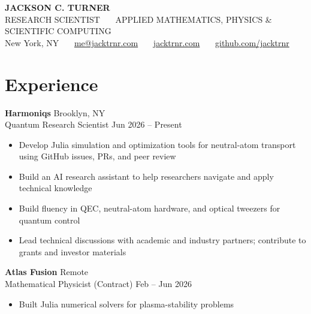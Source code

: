 \documentclass[10pt]{article}
\begin{document}
\fontsize{10.7pt}{13.4pt}\selectfont

\begin{center}
    {\Large\bfseries JACKSON C. TURNER}\\[3pt]
    {\color{accent}\small RESEARCH SCIENTIST \ \textbar\ \ APPLIED MATHEMATICS, PHYSICS \& SCIENTIFIC COMPUTING}\\[4pt]
    {\small New York, NY \ \textbar\ \ \href{mailto:me@jacktrnr.com}{me@jacktrnr.com} \ \textbar\ \ \href{https://www.jacktrnr.com}{jacktrnr.com} \ \textbar\ \ \href{https://github.com/jacktrnr}{github.com/jacktrnr}}\\[2pt]
\end{center}

\vspace{-2pt}

\section*{Experience}

\textbf{Harmoniqs} \hfill Brooklyn, NY\\[1pt]
{\color{accent}Quantum Research Scientist} \hfill Jun 2026 -- Present
\begin{itemize}
\item Develop Julia simulation and optimization tools for neutral-atom transport using GitHub issues, PRs, and peer review
\item Build an AI research assistant to help researchers navigate and apply technical knowledge
\item Build fluency in QEC, neutral-atom hardware, and optical tweezers for quantum control
\item Lead technical discussions with academic and industry partners; contribute to grants and investor materials
\end{itemize}
\vspace{2pt}

\textbf{Atlas Fusion} \hfill Remote\\[1pt]
{\color{accent}Mathematical Physicist (Contract)} \hfill Feb -- Jun 2026
\begin{itemize}
\item Built Julia numerical solvers for plasma-stability problems
\end{itemize}
\vspace{2pt}
\end{document}
